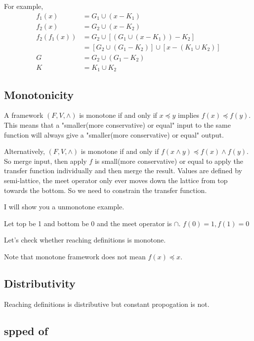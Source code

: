 For example, 
\begin{align*} 
    f_1(x) &= G_1 \cup (x - K_1)\\
    f_2(x) &= G_2 \cup (x - K_2) \\
    f_2(f_1(x)) &= G_2 \cup [(G_1 \cup (x - K_1)) - K_2] \\
    & = [G_2 \cup (G_1 - K_2)] \cup [x-(K_1 \cup K_2)] \\
    G &= G_2 \cup (G_1 - K_2) \\
    K &= K_1 \cup K_2
\end{align*}


\subsection{Monotonicity}


A framework \((F,V,\wedge)\) is monotone if and only if \(x \preceq y \) implies \(f(x) \preceq f(y)\). This means that
a "smaller(more conservative) or equal" input to the same function will always give a "smaller(more conservative)  or equal" output.



Alternatively, \((F,V,\wedge)\) is monotone if and only if \(  f(x \wedge y) \preceq f(x) \wedge f(y)\). So  merge input, then apply \(f\) is small(more conservative)  or equal to apply the transfer
function individually and then merge the result. Values are defined by semi-lattice, the meet operator only ever moves down the lattice from top towards the bottom. 
So we need to constrain the transfer function.

I will show you a unmonotone example.

Let top be 1 and bottom be 0 and the meet operator is \(\cap\). \(f(0) = 1, f(1) = 0\)


Let's check whether reaching definitions is monotone.


Note that monotone framework does not mean \(f(x) \preceq  x\).



\subsection{Distributivity}

Reaching definitions is distributive but constant propogation is not.



\subsection{spped of }

